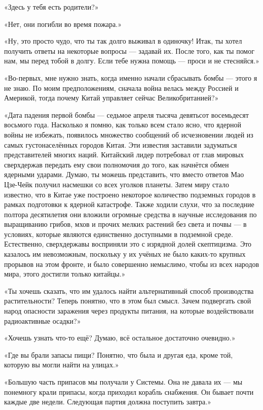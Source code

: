 \documentclass[a5paper, 9pt,
final, openany, twoside=true]{memoir}
\begin{document}
«Здесь у тебя есть родители?»

«Нет, они погибли во время пожара.»

«Ну, это просто чудо, что ты так долго выживал в одиночку! Итак, ты хотел получить ответы на некоторые вопросы — задавай их. После того, как ты помог нам, мы перед тобой в долгу. Если тебе нужна помощь — проси и не стесняйся.»

«Во-первых, мне нужно знать, когда именно начали сбрасывать бомбы — этого я не знаю. По моим предположениям, сначала война велась между Россией и Америкой, тогда почему Китай управляет сейчас Великобританией?»

«Дата падения первой бомбы — седьмое апреля тысяча девятьсот восемьдесят восьмого года. Насколько я помню, как только всем стало ясно, что ядерной войны не избежать, появилось множество сообщений об исчезновении людей из самых густонаселённых городов Китая. Эти известия заставили задуматься представителей многих наций. Китайский лидер потребовал от глав мировых сверхдержав передать ему свои полномочия до того, как начнётся обмен ядерными ударами. Думаю, ты можешь представить, что вместо ответов Мао Цзе-Чейк получил насмешки со всех уголков планеты. Затем миру стало известно, что в Китае уже построено некоторое количество подземных городов в рамках подготовки к ядерной катастрофе. Также ходили слухи, что за последние полтора десятилетия они вложили огромные средства в научные исследования по выращиванию грибов, мхов и прочих мелких растений без света и почвы — в условиях, которые являются единственно доступными в подземной среде. Естественно, сверхдержавы восприняли это с изрядной долей скептицизма. Это казалось им невозможным, поскольку у их учёных не было каких-то крупных прорывов на этом фронте, и было совершенно немыслимо, чтобы из всех народов мира, этого достигли только китайцы.»

«Ты хочешь сказать, что им удалось найти альтернативный способ производства растительности? Теперь понятно, что в этом был смысл. Зачем подвергать свой народ опасности заражения через продукты питания, на которые воздействовали радиоактивные осадки?»

«Хочешь узнать что-то ещё? Думаю, всё остальное достаточно очевидно.»

«Где вы брали запасы пищи? Понятно, что была и другая еда, кроме той, которую вы могли найти на улицах.»

«Большую часть припасов мы получали у Системы. Она не давала их — мы понемногу крали припасы, когда приходил корабль снабжения. Он бывает почти каждые две недели. Следующая партия должна поступить завтра.»
\end{document}
